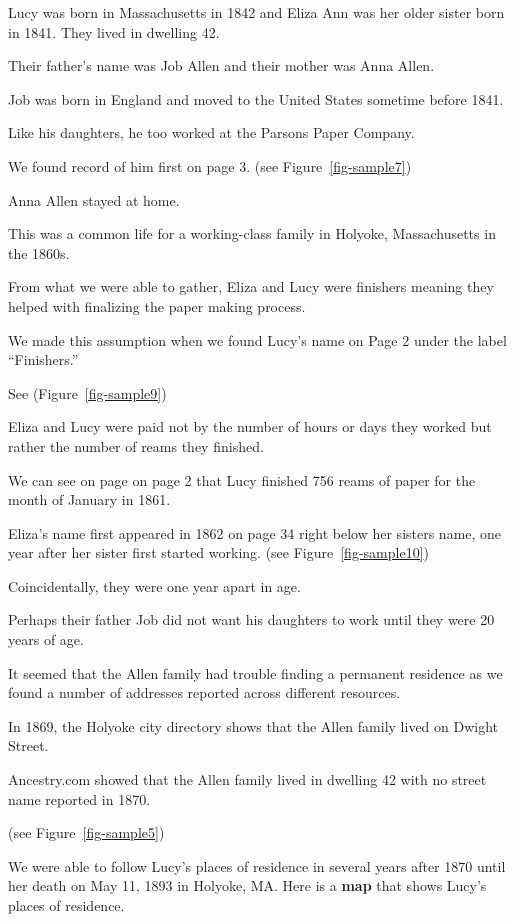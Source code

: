 \documentclass[
  letterpaper,
  DIV=11,
  numbers=noendperiod]{scrartcl}
\begin{document}
Lucy was born in Massachusetts in 1842 and Eliza Ann was her older
sister born in 1841. They lived in dwelling 42.

Their father's name was Job Allen and their mother was Anna Allen.

Job was born in England and moved to the United States sometime before
1841.

Like his daughters, he too worked at the Parsons Paper Company.

We found record of him first on page 3. (see Figure~\ref{fig-sample7})

Anna Allen stayed at home.

This was a common life for a working-class family in Holyoke,
Massachusetts in the 1860s.

From what we were able to gather, Eliza and Lucy were finishers meaning
they helped with finalizing the paper making process.

We made this assumption when we found Lucy's name on Page 2 under the
label ``Finishers.''

See (Figure~\ref{fig-sample9})

Eliza and Lucy were paid not by the number of hours or days they worked
but rather the number of reams they finished.

We can see on page on page 2 that Lucy finished 756 reams of paper for
the month of January in 1861.

Eliza's name first appeared in 1862 on page 34 right below her sisters
name, one year after her sister first started working. (see
Figure~\ref{fig-sample10})

Coincidentally, they were one year apart in age.

Perhaps their father Job did not want his daughters to work until they
were 20 years of age.

It seemed that the Allen family had trouble finding a permanent
residence as we found a number of addresses reported across different
resources.

In 1869, the Holyoke city directory shows that the Allen family lived on
Dwight Street.

Ancestry.com showed that the Allen family lived in dwelling 42 with no
street name reported in 1870.

(see Figure~\ref{fig-sample5})

We were able to follow Lucy's places of residence in several years after
1870 until her death on May 11, 1893 in Holyoke, MA. Here is a
\textbf{map} that shows Lucy's places of residence.
\end{document}
